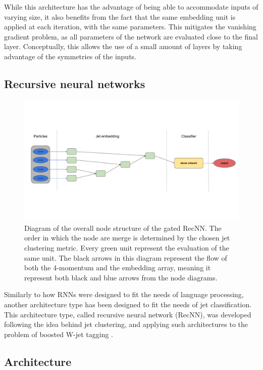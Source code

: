 While this architecture has the advantage of being able to accommodate inputs of varying size, it also benefits from the fact that the same embedding unit is applied at each iteration, with the same parameters. This mitigates the vanishing gradient problem, as all parameters of the network are evaluated close to the final layer. Conceptually, this allows the use of a small amount of layers by taking advantage of the symmetries of the inputs. 

\subsection{Recursive neural networks}
\label{sec:RecNN}


\begin{figure}
    \centering
    \includegraphics[width=\textwidth]{Images/RecNN_diagram_not_parall.pdf}
    \caption{Diagram of the overall node structure of the gated RecNN. The order in which the node are merge is determined by the chosen jet clustering metric. Every green unit represent the evaluation of the same unit. The black arrows in this diagram represent the flow of both the 4-momentum and the embedding array, meaning it represent both black and blue arrows from the node diagrams.}
    \label{fig:recursive_network}
\end{figure}

Similarly to how RNNs were designed to fit the needs of language processing, another architecture type has been designed to fit the needs of jet classification. This architecture type, called recursive neural network (RecNN), was developed following the idea behind jet clustering, and applying such architectures to the problem of boosted W-jet tagging \cite{Louppe:2017ipp}.

\subsection{Architecture}

